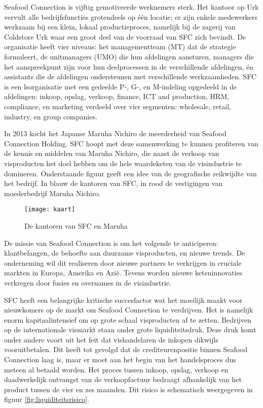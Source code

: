 Seafood Connection is vijftig gemotiveerde werknemers sterk. Het kantoor op Urk vervult alle bedrijfsfuncties grotendeels op één locatie; er zijn enkele medewerkers werkzaam bij een klein, lokaal productieproces, namelijk bij de zagerij van Coldstore Urk waar een groot deel van de voorraad van SFC zich bevindt. De organisatie heeft vier niveaus: het managementteam (MT) dat de strategie formuleert, de unitmanagers (UMO) die hun afdelingen aansturen, managers die het aanspreekpunt zijn voor hun deelprocessen in de verschillende afdelingen, én assistants die de afdelingen ondersteunen met verschillende werkzaamheden. SFC is een \gls{lsorganisatie} met een gedeelde P-, G-, en M-indeling opgedeeld in de afdelingen: inkoop, opslag, verkoop, finance, ICT and production, HRM, compliance, en marketing verdeeld over vier segmenten: wholesale, retail, industry, en group companies. \citep{quickscan}

In 2013 kocht het Japanse Maruha Nichiro de meerderheid van Seafood Connection Holding. SFC hoopt met deze samenwerking te kunnen profiteren van de kennis en middelen van Maruha Nichiro, die naast de verkoop van visproducten het doel hebben om de hele waardeketen van de visindustrie te domineren. Onderstaande figuur geeft een idee van de geografische reikwijdte van het bedrijf. In blauw de kantoren van SFC, in rood de vestigingen van moederbedrijf Maruha Nichiro. \citep{sfcwebsite,Visserijnieuws}

\begin{figure}[!h]
    \centering
    \texttt{[image: kaart]}
    \caption{De kantoren van SFC en Maruha \citep{sfcwebsite}}
    \label{fig:kantorensfc}
\end{figure}

De missie van Seafood Connection is om het volgende te anticiperen: klantbelangen, de behoefte aan duurzame visproducten, en nieuwe trends. De onderneming wil dit realiseren door nieuwe partners te verkrijgen in cruciale markten in Europa, Amerika en Azië. Tevens worden nieuwe keteninnovaties verkregen door fusies en overnames in de visindustrie. \citep{sfcwebsite}

\label{beschr:activiteiten}
SFC heeft een belangrijke kritische succesfactor wat het moeilijk maakt voor nieuwkomers op de markt om Seafood Connection te verdrijven. Het is namelijk enorm kapitaalintensief om op grote schaal visproducten af te zetten. Bedrijven op de internationale vismarkt staan onder grote liquiditeitsdruk. Deze druk komt onder andere voort uit het feit dat vishandelaren de inkopen dikwijls vooruitbetalen. Dit heeft tot gevolgd dat de crediteurenpositie binnen Seafood Connection laag is, maar er moet aan het begin van het handelsproces dus meteen al betaald worden. Het proces tussen inkoop, opslag, verkoop en daadwerkelijk ontvangst van de verkoopfactuur bedraagt afhankelijk van het product tussen de vier en zes maanden. Dit risico is schematisch weergegeven in figuur \ref{fig:liquiditeitsrisico}. 

